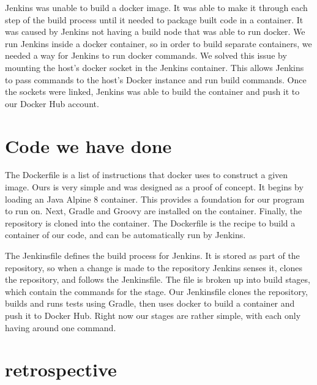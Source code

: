 \documentclass[onecolumn, draftclsnofoot,10pt, compsoc]{IEEEtran}
\begin{document}
Jenkins was unable to build a docker image.  It was able to make it through each step of the build process until it needed to package built code in a container.  It was caused by Jenkins not having a build node that was able to run docker.  We run Jenkins inside a docker container, so in order to build separate containers, we needed a way for Jenkins to run docker commands.  We solved this issue by mounting the host's docker socket in the Jenkins container.  This allows Jenkins to pass commands to the host's Docker instance and run build commands.  Once the sockets were linked, Jenkins was able to build the container and push it to our Docker Hub account.


\section{Code we have done}
The Dockerfile is a list of instructions that docker uses to construct a given image.  Ours is very simple and was designed as a proof of concept.  It begins by loading an Java Alpine 8 container.  This provides a foundation for our program to run on.  Next, Gradle and Groovy are installed on the container.  Finally, the repository is cloned into the container.  The Dockerfile is the recipe to build a container of our code, and can be automatically run by Jenkins.

The Jenkinsfile defines the build process for Jenkins.  It is stored as part of the repository, so when a change is made to the repository Jenkins senses it, clones the repository, and follows the Jenkinsfile.  The file is broken up into build stages, which contain the commands for the stage.  Our Jenkinsfile clones the repository, builds and runs tests using Gradle, then uses docker to build a container and push it to Docker Hub.  Right now our stages are rather simple, with each only having around one command.


\section{retrospective}
  
\end{document}
